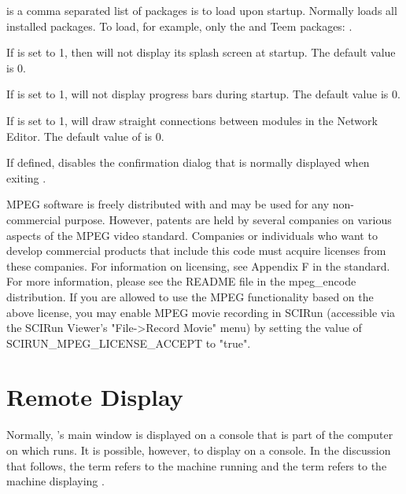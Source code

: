 \begin{description}
   is a comma separated list of packages
  \sr{} is to load upon startup.  Normally \sr{} loads all installed
  packages.  To load, for example, only the \BIOPSE{} and Teem
  packages: .

  If  is set to 1, then \sr{} will not display
  its splash screen at startup.  The default value is 0.

  If  is set to 1, \sr{} will not display
  progress bars during startup.  The default value is 0.
  
  If  is set to 1, \sr{} will draw
  straight connections between modules in the Network Editor.  The
  default value of  is 0.

   If defined, disables the confirmation
  dialog that is normally displayed when exiting \sr.
  
   MPEG software is freely
  distributed with \sr{} and may be used for any non-commercial
  purpose.  However, patents are held by several companies on various
  aspects of the MPEG video standard. Companies or individuals who
  want to develop commercial products that include this code must
  acquire licenses from these companies. For information on licensing,
  see Appendix F in the standard. For more information, please see the
  README file in the mpeg\_encode distribution. If you are allowed to
  use the MPEG functionality based on the above license, you may
  enable MPEG movie recording in SCIRun (accessible via the SCIRun
  Viewer's "File->Record Movie" menu) by setting the value of
  SCIRUN\_MPEG\_LICENSE\_ACCEPT to "true".
\end{description}

\section{Remote Display}
\label{sec:remote-display}

Normally, \sr{}'s main window is displayed on a console that is part
of the computer on which \sr{} runs.  It is possible, however, to
display \sr{} on a  console.  In the discussion that
follows, the term  refers to the machine running \sr{} and
the term  refers to the machine displaying \sr{}.

